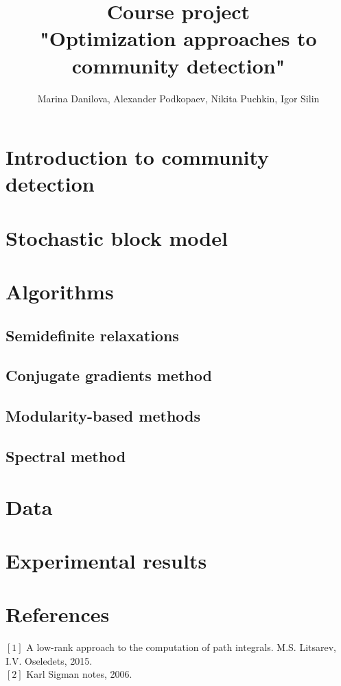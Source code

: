 \documentclass[11pt,a4paper]{extarticle}
\title{Course project \\
"Optimization approaches to community detection"}
\author{ Marina Danilova, Alexander Podkopaev, Nikita Puchkin, Igor Silin }
\begin{document}
\maketitle

\section{Introduction to community detection}

\section{Stochastic block model}

\section{Algorithms}
	
	\subsection{Semidefinite relaxations}
	\subsection{Conjugate gradients method}
	\subsection{Modularity-based methods}
	\subsection{Spectral method}

\section{Data}

\section{Experimental results}


\section{References}
     $[1]$  A low-rank approach to the computation of path integrals. M.S. Litsarev, I.V. Oseledets, 2015.\\
     $[2]$ Karl Sigman notes, 2006.\\
\end{document}
